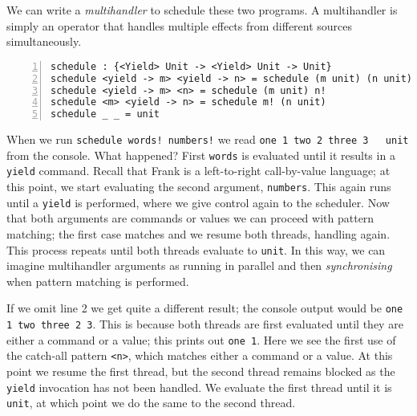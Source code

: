 \documentclass[msc,deptreport,cs]{infthesis} %
\newcommand{\code}[1]{\lstinline{#1}}
\begin{document}
We can write a \emph{multihandler} to schedule these two programs. A
multihandler is simply an operator that handles multiple effects from different
sources simultaneously.

\begin{lstlisting}[numbers=left]
schedule : {<Yield> Unit -> <Yield> Unit -> Unit}
schedule <yield -> m> <yield -> n> = schedule (m unit) (n unit)
schedule <yield -> m> <n> = schedule (m unit) n!
schedule <m> <yield -> n> = schedule m! (n unit)
schedule _ _ = unit
\end{lstlisting}

When we run \code{schedule words! numbers!} we read \code{one 1 two 2 three 3
  unit} from the console. What happened? First \code{words} is evaluated until
it results in a \code{yield} command. Recall that Frank is a left-to-right
call-by-value language; at this point, we start evaluating the second argument,
\code{numbers}. This again runs until a \code{yield} is performed, where we give
control again to the scheduler. Now that both arguments are commands or values
we can proceed with pattern matching; the first case matches and we resume both
threads, handling again. This process repeats until both threads evaluate to
\code{unit}. In this way, we can imagine multihandler arguments as running in
parallel and then \emph{synchronising} when pattern matching is performed.

If we omit line 2 we get quite a different result; the console output would be
\code{one 1 two three 2 3}. This is because both threads are first evaluated
until they are either a command or a value; this prints out \code{one 1}. Here
we see the first use of the catch-all pattern \code{<n>}, which matches either a
command or a value. At this point we resume the first thread, but the second
thread remains blocked as the \code{yield} invocation has not been handled. We
evaluate the first thread until it is \code{unit}, at which point we do the same
to the second thread.

\end{document}
